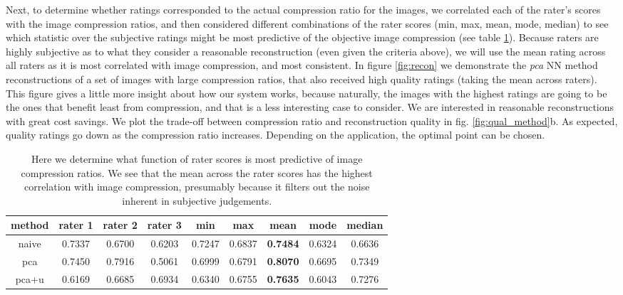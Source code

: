 Next, to determine whether ratings corresponded to the actual compression ratio for the images, we correlated each of the rater's scores with the image compression ratios, and then considered different combinations of the rater scores (min, max, mean, mode, median) to see which statistic over the subjective ratings might be most predictive of the objective image compression (see table \ref{tab:corr}). Because raters are highly subjective as to what they consider a reasonable reconstruction (even given the criteria above), we will use the mean rating across all raters as it is most correlated with image compression, and most consistent. In figure \ref{fig:recon} we demonstrate the \emph{pca} NN method reconstructions of a set of images with large compression ratios, that also received high quality ratings (taking the mean across raters). This figure gives a little more insight about how our system works, because naturally, the images with the highest ratings are going to be the ones that benefit least from compression, and that is a less interesting case to consider. We are interested in reasonable reconstructions with great cost savings. We plot the trade-off between compression ratio and reconstruction quality in fig. \ref{fig:qual_method}b. As expected, quality ratings go down as the compression ratio increases. Depending on the application, the optimal point can be chosen.

\begin{table}
\centering
\begin{tabular}{|c|c|c|c|c|c|c|c|c|}
 \hline
\textbf{method} & \textbf{rater 1} & \textbf{rater 2} & \textbf{rater 3}  & \textbf{min} & \textbf{max} & \textbf{mean} & \textbf{mode} & \textbf{median}\\ \hline
naive & 0.7337 & 0.6700 & 0.6203  & 0.7247 & 0.6837 & \textbf{0.7484} & 0.6324 & 0.6636 \\ \hline
pca & 0.7450 & 0.7916 & 0.5061 & 0.6999 & 0.6791 &  \textbf{0.8070} & 0.6695 & 0.7349 \\ \hline
pca+u & 0.6169 & 0.6685 & 0.6934 & 0.6340 & 0.6755 &  \textbf{0.7635} & 0.6043 & 0.7276  \\ \hline
\end{tabular}
\caption{Here we determine what function of rater scores is most predictive of image compression ratios. We see that the mean across the rater scores has the highest correlation with image compression, presumably because it filters out the noise inherent in subjective judgements.}
\label{tab:corr}
\end{table}


